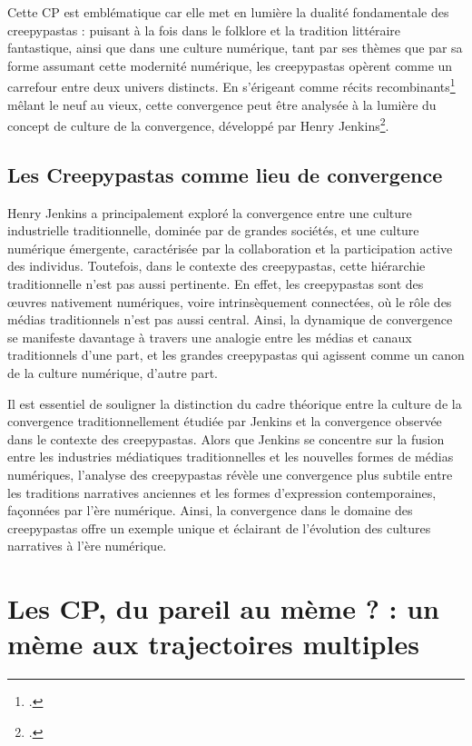 \documentclass[12pt,a4paper,oneside,titlepage]{book} %
\begin{document}
Cette CP est emblématique car elle met en lumière la dualité fondamentale des creepypastas : puisant à la fois dans le folklore et la tradition littéraire fantastique, ainsi que dans une culture numérique, tant par ses thèmes que par sa forme assumant cette modernité numérique, les creepypastas opèrent comme un carrefour entre deux univers distincts. En s'érigeant comme récits recombinants\footcite{jacobs_character_1990} mêlant le neuf au vieux, cette convergence peut être analysée à la lumière du concept de culture de la convergence, développé par Henry Jenkins\footcite{jenkins_convergence_2006}.

\section{Les Creepypastas comme lieu de convergence}

Henry Jenkins a principalement exploré la convergence entre une culture industrielle traditionnelle, dominée par de grandes sociétés, et une culture numérique émergente, caractérisée par la collaboration et la participation active des individus. Toutefois, dans le contexte des creepypastas, cette hiérarchie traditionnelle n'est pas aussi pertinente. En effet, les creepypastas sont des œuvres nativement numériques, voire intrinsèquement connectées, où le rôle des médias traditionnels n'est pas aussi central. Ainsi, la dynamique de convergence se manifeste davantage à travers une analogie entre les médias et canaux traditionnels d'une part, et les grandes creepypastas qui agissent comme un canon de la culture numérique, d'autre part.

Il est essentiel de souligner la distinction du cadre théorique entre la culture de la convergence traditionnellement étudiée par Jenkins et la convergence observée dans le contexte des creepypastas. Alors que Jenkins se concentre sur la fusion entre les industries médiatiques traditionnelles et les nouvelles formes de médias numériques, l'analyse des creepypastas révèle une convergence plus subtile entre les traditions narratives anciennes et les formes d'expression contemporaines, façonnées par l'ère numérique. Ainsi, la convergence dans le domaine des creepypastas offre un exemple unique et éclairant de l'évolution des cultures narratives à l'ère numérique.


\chapter[Les CP : du pareil au mème ? ]{Les CP, du pareil au mème ?  :  un mème aux trajectoires multiples}
\end{document}
